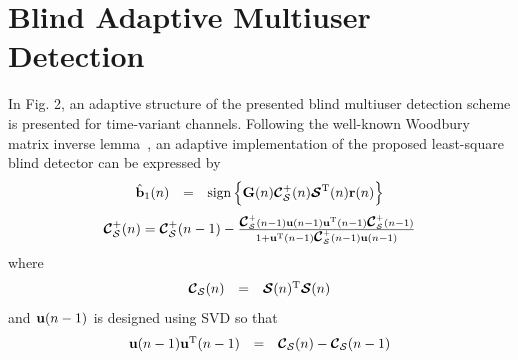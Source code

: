 \documentclass[a4paper,10pt,fleqn, twocolumn]{IEEETran}
\newcommand{\br}{{\mathbf r}}
\newcommand{\bb}{{\bf b}}
\newcommand{\bG}{{\bf G}}
\newcommand{\bu}{{\bf u}}
\newcommand{\bcC}{{\mbox {\boldmath ${\cal C}$}}}
\newcommand{\bcS}{{\mbox {\boldmath ${\cal S}$}}}
\begin{document}
\section{Blind Adaptive Multiuser Detection\label{updatingG}}
\begin{figure}
\label{AMUDstruct}
\end{figure}
In Fig. 2, an adaptive structure of the presented blind multiuser
detection scheme is presented for time-variant channels. Following
the well-known Woodbury matrix inverse lemma~\cite{Golu96}, an
adaptive implementation of  the proposed least-square blind
detector can be expressed by
\begin{equation}\hspace{-0.0in}
\begin{array}{rcl}
\hat{\bb}_1(n)&=&\mbox{sign}\left\{\bG(n)\bcC_{\cal
S}^{+}(n)\bcS^{\rm T}(n)\br(n)\right\}
\end{array}
\end{equation}
\begin{equation}\hspace{-0.0in}
\begin{array}{l}
\bcC_{\cal S}^{+}(n)=\bcC_{\cal S}^{+}(n-1)-\frac{\bcC_{\cal
S}^{+}(n-1)\bu(n-1)\bu^{\rm T}(n-1)\bcC_{\cal
S}^{+}(n-1)}{1+\bu^{\rm T}(n-1)\bcC_{\cal S}^{+}(n-1)\bu(n-1)}
\end{array}\label{adaptiveLS}
\end{equation}
\noindent where
\begin{equation}\hspace{-0.0in}
\begin{array}{rcl}
\bcC_{\cal S}(n)&=&\bcS(n)^{\rm T}\bcS(n)
\end{array}
\end{equation}
 \noindent and $\bu(n-1)$ is designed using SVD so that
\begin{equation}\hspace{-0.00in}
\begin{array}{rcl}
\bu(n-1)\bu^{\rm T}(n-1)&=&\bcC_{\cal S}(n)-\bcC_{\cal S}(n-1)
\end{array}
\end{equation}
\end{document}
